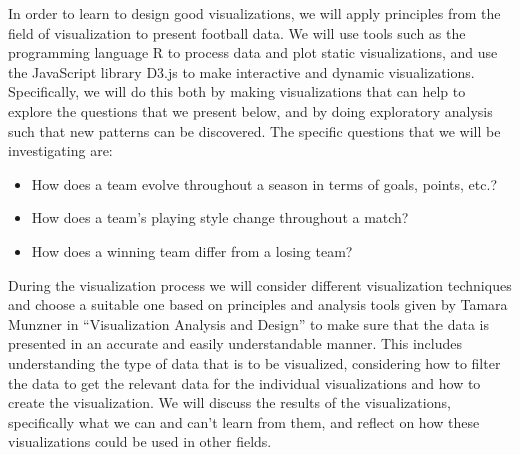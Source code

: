 \documentclass[Report.tex]{subfiles}
\begin{document}
In order to learn to design good visualizations, we will apply principles from the field of visualization to present football data. We will use tools such as the programming language R to process data and plot static visualizations, and use the JavaScript library D3.js to make interactive and dynamic visualizations. 
Specifically, we will do this both by making visualizations that can help to explore the questions that we present below, and by doing exploratory analysis such that new patterns can be discovered. The specific questions that we will be investigating are: 
\begin{itemize}
\item How does a team evolve throughout a season in terms of goals, points,
etc.?
\item How does a team’s playing style change throughout a match?
\item How does a winning team differ from a losing team?
\end{itemize}
During the visualization process we will consider different visualization techniques and choose a suitable one based on principles and analysis tools given by Tamara Munzner in “Visualization Analysis and Design” to make sure that the data is presented in an accurate and easily understandable manner. This includes understanding the type of data that is to be visualized, considering how to filter the data to get the relevant data for the individual visualizations and how to create the visualization. We will discuss the results of the visualizations, specifically what we can and can’t learn from them, and reflect on how these visualizations could be used in other fields.
\end{document}
